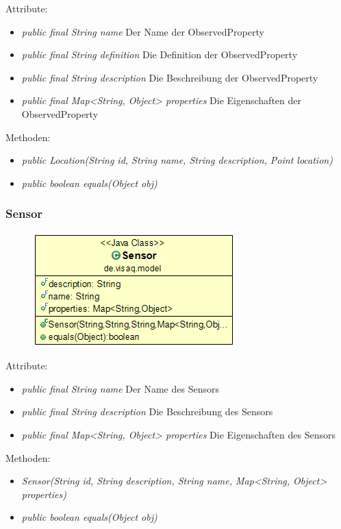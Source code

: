 Attribute:
\begin{itemize} 
	\item \emph{public final String name} Der Name der ObservedProperty
	\item \emph{public final String definition} Die Definition der ObservedProperty
	\item \emph{public final String description} Die Beschreibung der ObservedProperty
	\item \emph{public final Map<String, Object> properties} Die Eigenschaften der ObservedProperty
\end{itemize}
Methoden:
\begin{itemize} 
	\item \emph{public Location(String id, String name, String description, Point location)} 
	\item \emph{public boolean equals(Object obj)} 
\end{itemize}


\subsubsection {Sensor}
\begin{minipage}{0.3\textwidth}
	\begin{figure}[H]
		\includegraphics[scale = 0.5
		]{media/frontend/model/Sensor_Class.png}
	\end{figure}
\end{minipage} \hfill
\begin{minipage}{0.6\textwidth}
\end{minipage}

Attribute:
\begin{itemize} 
	\item \emph{public final String name} Der Name des Sensors
	\item \emph{public final String description} Die Beschreibung des Sensors
	\item \emph{public final Map<String, Object> properties} Die Eigenschaften des Sensors
\end{itemize}
Methoden:
\begin{itemize} 
	\item \emph{Sensor(String id, String description, String name, Map<String, Object> properties)} 
	\item \emph{public boolean equals(Object obj)} 
\end{itemize}

